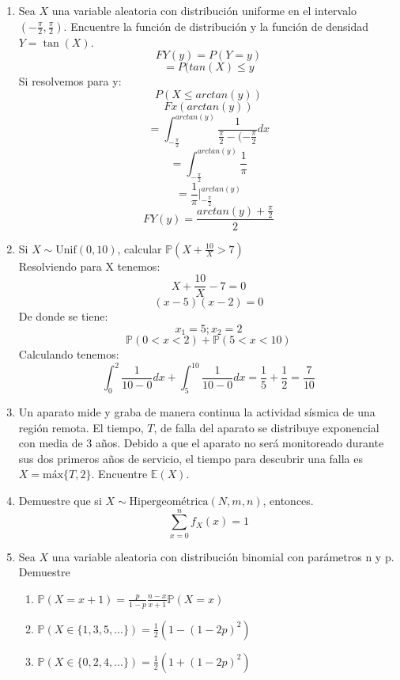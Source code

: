 \documentclass[11pt,a4paper]{report}
\begin{document}
\begin{enumerate}
		\item{
			Sea $X$ una variable aleatoria con distribución uniforme en el
			intervalo $(-\frac{\pi}{2}, \frac{\pi}{2})$. Encuentre la función de
			distribución y la función de densidad $Y = \tan(X)$.\\
			\[FY(y) = P(Y = y)\]
		\[=P(tan(X) \le y\]
		Si resolvemos para y:
		\[P(X \le arctan(y))\]
		\[Fx(arctan(y))\]
		\[= \int^{arctan(y)}_{-\frac{\pi}{2}}\frac{1}{\frac{\pi}{2}- (- \frac{\pi}{2}}dx\]
		\[= \int^{arctan(y)}_{-\frac{\pi}{2}} \frac{1}{\pi}\]
		\[=\frac{1}{\pi}|^{arctan(y)}_{-\frac{\pi}{2}}\]
		\[FY(y)=\frac{arctan(y) + \frac{\pi}{2}}{2}\]
			
		}

		\item{
			Si $X \sim \text{Unif}(0, 10)$, calcular
			$\mathbb{P}(X + \frac{10}{X} > 7)$\\
			Resolviendo para X tenemos:
			\[X + \frac{10}{X} - 7 = 0\]
			\[ (x - 5) (x - 2) = 0\]
			De donde se tiene:
			\[x_1 = 5 ; x_2 = 2\]
			\[\mathbb{P}(0 < x < 2) + \mathbb{P}(5 < x <10)\]
			Calculando tenemos:
			\[\int^{2}_{0}\frac{1}{10-0}dx + \int^{10}_{5}\frac{1}{10-0}dx = \frac{1}{5} + \frac{1}{2} = \frac{7}{10}\]
			
		}


		\item{
			Un aparato mide y graba de manera continua la actividad sísmica de
			una región remota. El tiempo, $T$, de falla del aparato se
			distribuye exponencial con media de 3 años. Debido a que el aparato
			no será monitoreado durante sus dos primeros años de servicio, el
			tiempo para descubrir una falla es $X = \text{máx}\{T,2\}$.
			Encuentre $\mathbb{E}(X)$.
		}

		\item{
			Demuestre que si $X \sim \text{Hipergeométrica}(N,m,n)$, entonces.
				$$ \sum_{x = 0}^{n}f_X(x) = 1$$
		}

		\item{
			Sea $X$ una variable aleatoria con distribución binomial con
			parámetros n y p. Demuestre
			\begin{enumerate}
				\item {
					$\mathbb{P}(X = x + 1) = \frac{p}{1 - p} \frac{n - x}{x + 1}
					 \mathbb{P}(X = x)$
				}

				\item {
					$\mathbb{P}(X \in \{ 1,3,5,...\}) = \frac{1}{2}
					 (1 - (1 - 2p)^2)$
				}

				\item {
					$\mathbb{P}(X \in \{ 0,2,4,...\}) = \frac{1}{2}
					 (1 + (1 - 2p)^2)$
				}
			\end{enumerate}
		}


\end{enumerate}
\end{document}
